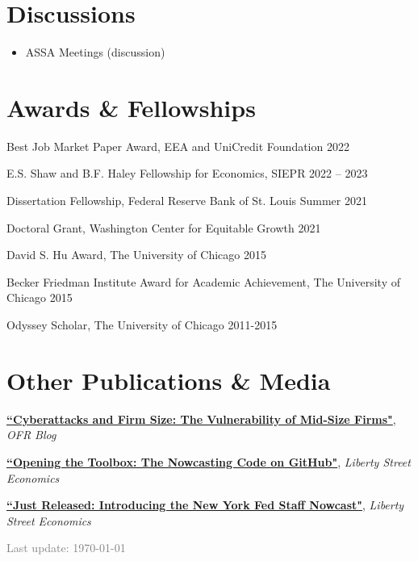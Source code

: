 \documentclass[margin,line]{res}                          %
\newenvironment{list1}{
	\begin{list}{\ding{113}}{%
			\setlength{\itemsep}{0in}
			\setlength{\parsep}{0in} \setlength{\parskip}{0in}
			\setlength{\topsep}{0in} \setlength{\partopsep}{0in}
			\setlength{\leftmargin}{0.17in}}}{\end{list}}
\begin{document}
\begin{resume}
	\section{\sc Discussions}
	\begin{list1}
		\item[]
		\begin{itemize}\setlength{\itemindent}{.3cm}
			\item[2025:]\makebox[0.1cm]{\hfill} ASSA Meetings (discussion)
		\end{itemize}		
	\end{list1}
	
	
	\section{\sc Awards \& Fellowships}
	\begin{list1}
		\item[] Best Job Market Paper Award, EEA and UniCredit Foundation
		\hfill 2022\smallskip
		\item[] E.S. Shaw and B.F. Haley Fellowship for Economics, SIEPR \hfill 2022 -- 2023\smallskip
		\item[] Dissertation Fellowship, Federal Reserve Bank of St. Louis  \hfill Summer 2021\smallskip
		\item[] Doctoral Grant, Washington Center for Equitable Growth \hfill 2021\smallskip
		\item[] David S. Hu Award, The University of Chicago \hfill 2015\smallskip
		\item[] Becker Friedman Institute Award for Academic Achievement, The University of Chicago \hfill 2015\smallskip
		\item[] Odyssey Scholar, The University of Chicago \hfill 2011-2015\smallskip
	\end{list1}
	
	\section{\sc Other Publications \& Media} 
	\begin{list1}
		\item[] \href{https://www.financialresearch.gov/the-ofr-blog/2025/09/18/cyberattack-firm-size-vulnerability-mid-size-firms/}{\textbf{``Cyberattacks and Firm Size: The Vulnerability of Mid-Size Firms"}}, \textit{{OFR Blog}}  \smallskip
		\item[] \href{https://libertystreeteconomics.newyorkfed.org/2018/08/opening-the-toolbox-the-nowcasting-code-on-github/}{\textbf{``Opening the Toolbox: The Nowcasting Code on GitHub"}}, \textit{{Liberty Street Economics}}  \smallskip
		\item[] \href{https://libertystreeteconomics.newyorkfed.org/2016/04/just-released-introducing-the-frbny-nowcast/}{\textbf{``Just Released: Introducing the New York Fed Staff Nowcast"}}, \textit{{Liberty Street Economics}} \smallskip            
	\end{list1}
	\vfill
	\hfill \textcolor{gray}{Last update: \today} 
	

\end{resume}
\end{document}
